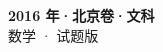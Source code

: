\documentclass[zihao=-4, a4paper]{ctexart}
\begin{document}
\begin{center}
  {\Large\bfseries 2016 年·北京卷·文科}\\[4pt]
  {\large 数学 · 试题版}
\end{center}
\medskip
{}

\end{document}
